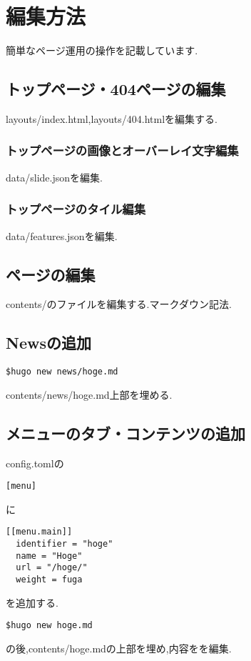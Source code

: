 \section{編集方法}
簡単なページ運用の操作を記載しています.

\subsection{トップページ・404ページの編集}
layouts/index.html,layouts/404.htmlを編集する.

\subsubsection{トップページの画像とオーバーレイ文字編集}
data/slide.jsonを編集.

\subsubsection{トップページのタイル編集}
data/features.jsonを編集.

\subsection{ページの編集}
contents/のファイルを編集する.マークダウン記法.

\subsection{Newsの追加}
\begin{lstlisting}[]
  $hugo new news/hoge.md
\end{lstlisting}

contents/news/hoge.md上部を埋める.

\subsection{メニューのタブ・コンテンツの追加}
config.tomlの
\begin{lstlisting}[]
  [menu]
\end{lstlisting}
に
\begin{lstlisting}[]
[[menu.main]]
  identifier = "hoge"
  name = "Hoge"
  url = "/hoge/"
  weight = fuga
\end{lstlisting}
を追加する.

\begin{lstlisting}[]
  $hugo new hoge.md
\end{lstlisting}
の後,contents/hoge.mdの上部を埋め,内容をを編集.

